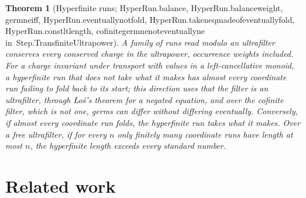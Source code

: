 \documentclass[11pt]{article}
\newtheorem{theorem}{Theorem}
\theoremstyle{remark}
\newcommand{\lean}[1]{{\ttfamily\def\_{\textunderscore\allowbreak}#1}}
\newcommand{\inmod}[1]{in~{\ttfamily\def\_{\textunderscore\allowbreak}#1}}
\begin{document}
\begin{theorem}[Hyperfinite runs; \lean{HyperRun.balance}, \lean{HyperRun.balance\_weight}, \lean{germ\_ne\_iff}, \lean{HyperRun.eventually\_not\_fold}, \lean{HyperRun.taken\_eq\_made\_of\_eventually\_fold}, \lean{HyperRun.const\_lt\_length}, \lean{cofinite\_germ\_ne\_not\_eventually\_ne} \inmod{Step.TransfiniteUltrapower}]
A family of runs read modulo an ultrafilter conserves every conserved charge in the ultrapower,
occurrence weights included. For a charge invariant under transport with values in a left-cancellative
monoid, a hyperfinite run that does not take what it makes has almost every coordinate run failing to
fold back to its start; this direction uses that the filter is an ultrafilter, through {\L}o\'s's
theorem for a negated equation, and over the cofinite filter, which is not one, germs can differ
without differing eventually. Conversely, if almost every coordinate run folds, the hyperfinite run
takes what it makes. Over a free ultrafilter, if for every $n$ only finitely many coordinate runs have
length at most $n$, the hyperfinite length exceeds every standard number.
\end{theorem}

\section{Related work}
\end{document}
